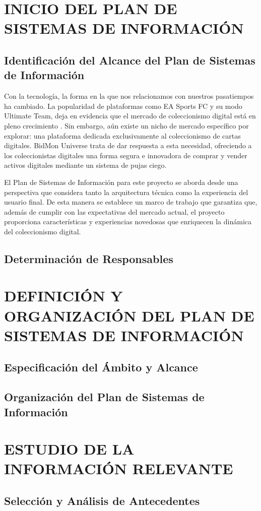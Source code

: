 
\section{INICIO DEL PLAN DE SISTEMAS DE INFORMACIÓN}
 
\subsection{Identificación del Alcance del Plan de Sistemas de Información}
Con la tecnología, la forma en la que nos relacionamos con nuestros pasatiempos ha cambiado. La popularidad de plataformas como EA Sports FC y su modo Ultimate Team\cite{artsEASPORTSFC2023}, deja en evidencia que el mercado de coleccionismo digital está en pleno crecimiento \cite{sanmartin000MillonesDolares2021}. Sin embargo, aún existe un nicho de mercado específico por explorar: una plataforma dedicada exclusivamente al coleccionismo de cartas digitales.
BidMon Universe trata de dar respuesta a esta necesidad, ofreciendo a los coleccionistas digitales una forma segura e innovadora de comprar y vender activos digitales mediante un sistema de pujas ciego.

El Plan de Sistemas de Información para este proyecto se aborda desde una perspectiva que considera tanto la arquitectura técnica como la experiencia del usuario final. De esta manera se establece un marco de trabajo que garantiza que, además de cumplir con las expectativas del mercado actual, el proyecto proporciona características y experiencias novedosas que enriquecen la dinámica del coleccionismo digital.


\subsection{Determinación de Responsables}


\newpage
\section{DEFINICIÓN Y ORGANIZACIÓN DEL PLAN DE SISTEMAS DE INFORMACIÓN}
 

\subsection{Especificación del Ámbito y Alcance} 


\subsection{Organización del Plan de Sistemas de Información }



\newpage
\section{ESTUDIO DE LA INFORMACIÓN RELEVANTE}
 
\subsection{Selección y Análisis de Antecedentes} 
